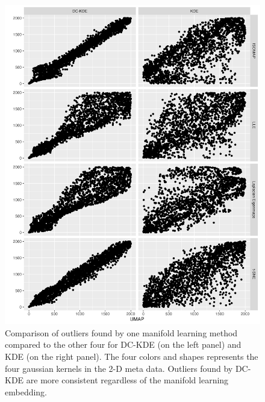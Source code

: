 \documentclass[11pt,a4paper,]{article}
\begin{document}
\begin{figure}

{\centering \includegraphics[width=0.95\linewidth]{figures/Twin Peak2000_density_compare_umapvs4ml_radius8_r0_5_rank} 

}

\caption{Comparison of outliers found by one manifold learning method compared to the other four for DC-KDE (on the left panel) and KDE (on the right panel). The four colors and shapes represents the four gaussian kernels in the 2-D meta data. Outliers found by DC-KDE are more consistent regardless of the manifold learning embedding.}\label{fig:tpllevs4ml-4}
\end{figure}

\printbibliography
\end{document}
